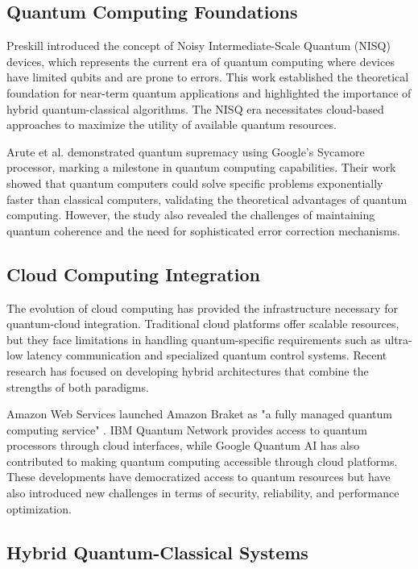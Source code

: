 \documentclass[onecolumn]{IEEEtran}
\begin{document}
\subsection{Quantum Computing Foundations}

Preskill \cite{preskill2018} introduced the concept of Noisy Intermediate-Scale Quantum (NISQ) devices, which represents the current era of quantum computing where devices have limited qubits and are prone to errors. This work established the theoretical foundation for near-term quantum applications and highlighted the importance of hybrid quantum-classical algorithms. The NISQ era necessitates cloud-based approaches to maximize the utility of available quantum resources.

Arute et al. \cite{arute2019} demonstrated quantum supremacy using Google's Sycamore processor, marking a milestone in quantum computing capabilities. Their work showed that quantum computers could solve specific problems exponentially faster than classical computers, validating the theoretical advantages of quantum computing. However, the study also revealed the challenges of maintaining quantum coherence and the need for sophisticated error correction mechanisms.

\subsection{Cloud Computing Integration}

The evolution of cloud computing has provided the infrastructure necessary for quantum-cloud integration. Traditional cloud platforms offer scalable resources, but they face limitations in handling quantum-specific requirements such as ultra-low latency communication and specialized quantum control systems. Recent research has focused on developing hybrid architectures that combine the strengths of both paradigms.

Amazon Web Services launched Amazon Braket as "a fully managed quantum computing service" \cite{aws_braket}. IBM Quantum Network \cite{ibm_quantum} provides access to quantum processors through cloud interfaces, while Google Quantum AI \cite{google_quantum} has also contributed to making quantum computing accessible through cloud platforms. These developments have democratized access to quantum resources but have also introduced new challenges in terms of security, reliability, and performance optimization.

\subsection{Hybrid Quantum-Classical Systems}
\end{document}
